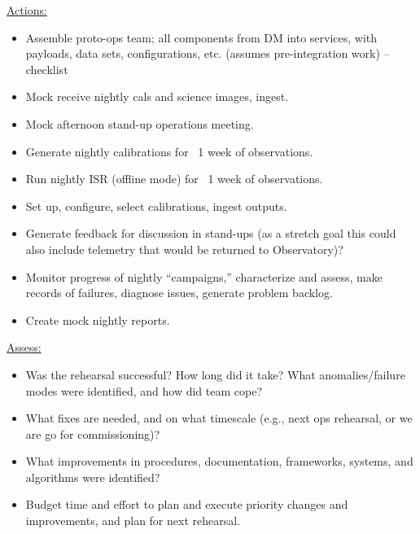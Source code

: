 \underline{Actions:}

\begin{itemize}
\item Assemble proto-ops team; all components from DM into services, with payloads, data sets, configurations, etc. (assumes pre-integration work) -- checklist
\item Mock receive nightly cals and science images, ingest.
\item Mock afternoon stand-up operations meeting.
\item Generate nightly calibrations for ~1 week of observations.
\item Run nightly ISR (offline mode) for ~1 week of observations.
\item Set up, configure, select calibrations, ingest outputs.
\item Generate feedback for discussion in stand-ups (as a stretch goal this could also include telemetry that would be returned to Observatory)?
\item Monitor progress of nightly “campaigns,” characterize and assess, make records of failures, diagnose issues, generate problem backlog.
\item Create mock nightly reports.
\end{itemize}

\underline{Assess:}

\begin{itemize}
\item Was the rehearsal successful? How long did it take? What anomalies/failure modes were identified, and how did team cope? 
\item What fixes are needed, and on what timescale (e.g., next ops rehearsal, or we are go for commissioning)? 
\item What improvements in procedures, documentation, frameworks, systems, and algorithms were identified?
\item Budget time and effort to plan and execute priority changes and improvements, and plan for next rehearsal.
\end{itemize}


